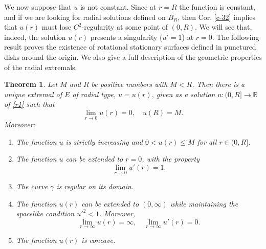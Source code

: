 \documentclass[a4paper,12pt]{amsart}
\newtheorem{theorem}{Theorem}[section]
\theoremstyle{definition}
\def\r{\mathbb R}
\begin{document}
We now suppose that $u$ is not constant. Since at $r=R$ the function is constant, and if we are looking for radial solutions defined on $B_R$, then Cor. \ref{c-32} implies that $u(r)$  must lose  $C^2$-regularity at some point of $(0,R)$. We will see that, indeed, the solution $u(r)$ presents a singularity ($u'=1$) at  $r=0$. The following result proves the existence of rotational stationary surfaces defined in punctured disks around the origin. We also give  a full description of the geometric properties of the radial extremals.  

\begin{theorem}\label{t51}
 Let $M$ and $R$ be positive numbers with $M<R$. Then there is a unique extremal of $E$ of radial type, $u=u(r)$, given as a solution $u \colon (0,R]\to\r$  of \eqref{r1} such that 
\begin{equation}\label{c1}\lim_{r\to 0}u(r)=0,\quad u(R)=M.
\end{equation}
Moreover: 
\begin{enumerate}
\item  The function $u$ is strictly increasing and $0< u(r)\leq M$ for all $r\in (0,R]$.
\item The function $u$ can be extended to   $r=0$, with the property 
$$\lim_{r\to 0}u'(r)=1.$$
\item The curve $\gamma $ is regular   on its  domain.
\item The function $u(r)$ can be extended to $(0,\infty)$ while maintaining  the spacelike condition $u'^2<1$. Moreover, 
$$\lim_{r\to \infty}u(r)=\infty,\quad  \lim_{r\to \infty}u'(r)=0.$$
\item The function $u(r)$ is concave. 
\end{enumerate} 
\end{theorem}
\end{document}
